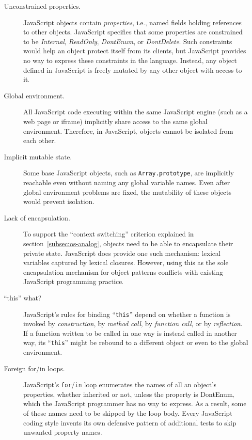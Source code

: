 \documentclass[letterpaper,twocolumn,10pt]{article}
\newcommand{\code}[1]{{\tt {#1}}}              %
\begin{document}
\begin{description}

  \item[Unconstrained properties.] JavaScript objects contain 
  \emph{properties}, i.e., named fields holding references to other objects. 
  JavaScript specifies that some properties are constrained to be 
  \emph{Internal}, \emph{ReadOnly}, \emph{DontEnum}, or \emph{DontDelete}. 
  Such constraints would help an object protect itself from its clients, but 
  JavaScript provides no way to express these constraints in the language. 
  Instead, any object defined in JavaScript is freely mutated by any other 
  object with access to it.
  
  \item[Global environment.] All JavaScript code executing within the same 
  JavaScript engine (such as a web page or iframe) implicitly share access to 
  the same global environment. Therefore, in JavaScript, objects cannot be 
  isolated from each other.

  \item[Implicit mutable state.] Some base JavaScript objects, such as 
  \code{Array.prototype}, are implicitly reachable even without naming any 
  global variable names. Even after global environment problems are fixed, 
  the mutability of these objects would prevent isolation.

  \item[Lack of encapsulation.] To support the ``context switching'' 
  criterion explained in section~\ref{subsec:os-analog}, objects need to be able to encapsulate their 
  private state. JavaScript does provide one such mechanism: lexical 
  variables captured by lexical closures. However, using this as the sole 
  encapsulation mechanism for object patterns conflicts with existing 
  JavaScript programming practice.

  \item[``this'' what?] JavaScript's rules for binding ``\code{this}'' depend 
  on whether a function is invoked by \emph{construction}, by \emph{method 
  call}, by \emph{function call}, or by \emph{reflection}. If a function 
  written to be called in one way is instead called in another way, its 
  ``\code{this}'' might be rebound to a different object or even to the 
  global environment.

  \item[Foreign for/in loops.] JavaScript's \code{for}/\code{in} loop enumerates the names of all an object's 
  properties, whether inherited or not, unless the property is DontEnum, which the JavaScript programmer has no way 
  to express. As a result, some of these names need to be skipped by the loop body. Every JavaScript coding style 
  invents its own defensive pattern of additional tests to skip unwanted property names.
    

\end{description}
\end{document}
